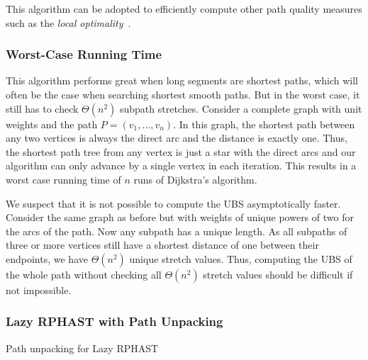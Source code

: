 \documentclass[a4paper,UKenglish,cleveref, autoref, thm-restate]{lipics-v2021}
\begin{document}

This algorithm can be adopted to efficiently compute other path quality measures such as the \emph{local optimality}~\cite{adgw-arrn-13}.

\subsubsection{Worst-Case Running Time}

This algorithm performs great when long segments are shortest paths, which will often be the case when searching shortest smooth paths.
But in the worst case, it still has to check $\Theta(n^2)$ subpath stretches.
Consider a complete graph with unit weights and the path $P=(v_1, \dots, v_n)$.
In this graph, the shortest path between any two vertices is always the direct arc and the distance is exactly one.
Thus, the shortest path tree from any vertex is just a star with the direct arcs and our algorithm can only advance by a single vertex in each iteration.
This results in a worst case running time of $n$ runs of Dijkstra's algorithm.

We suspect that it is not possible to compute the UBS asymptotically faster.
Consider the same graph as before but with weights of unique powers of two for the arcs of the path.
Now any subpath has a unique length.
As all subpaths of three or more vertices still have a shortest distance of one between their endpoints, we have $\Theta(n^2)$ unique stretch values.
Thus, computing the UBS of the whole path without checking all $\Theta(n^2)$ stretch values should be difficult if not impossible.

\subsubsection{Lazy RPHAST with Path Unpacking}
\label{sec:lazy_rphast_path}

\begin{algorithm2e}[t]

\caption{Path unpacking for Lazy RPHAST}
\label{algo:lazy_rphast_path}
\end{algorithm2e}
\end{document}

